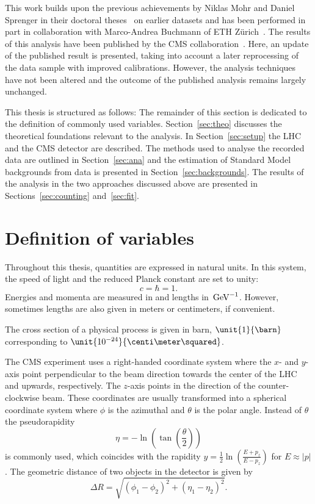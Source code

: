This work builds upon the previous achievements by Niklas Mohr and Daniel Sprenger in their doctoral theses~\cite{Mohr:1423334,Sprenger:1501963} on earlier datasets and has been performed in part in collaboration with Marco-Andrea Buchmann of ETH Z\"urich~\cite{Buchmann:1704399}. The results of this analysis have been published by the CMS collaboration~\cite{Khachatryan:2015lwa}. Here, an update of the published result is presented, taking into account a later reprocessing of the data sample with improved calibrations. However, the analysis techniques have not been altered and the outcome of the published analysis remains largely unchanged.

This thesis is structured as follows: The remainder of this section is dedicated to the definition of commonly used variables. Section~\ref{sec:theo} discusses the theoretical foundations relevant to the analysis. In Section~\ref{sec:setup} the LHC and the CMS detector are described. The methods used to analyse the recorded data are outlined in Section~\ref{sec:ana} and the estimation of Standard Model backgrounds from data is presented in Section~\ref{sec:backgrounds}. The results of the analysis in the two approaches discussed above are presented in Sections~\ref{sec:counting} and~\ref{sec:fit}. 

\section{Definition of variables}
\label{sec:variables}
Throughout this thesis, quantities are expressed in natural units. In this system, the speed of light and the reduced Planck constant are set to unity:
\begin{equation}
c = \hbar = 1.
\end{equation} 
Energies and momenta are measured in \GeV and lengths in $\text{\ensuremath{\,\mathrm{Ge\hspace{-.08em}V}}}^{-1}$. However, sometimes lengths are also given in meters or centimeters, if convenient. 

The cross section of a physical process is given in barn, $\unit{1}{\barn}$ corresponding to $\unit{10^{-24}}{\centi\meter\squared}$.   

The CMS experiment uses a right-handed coordinate system where the $x$- and $y$-axis point perpendicular to the beam direction towards the center of the LHC and upwards, respectively. The $z$-axis points in the direction of the counter-clockwise beam.  These coordinates are usually transformed into a spherical coordinate system where $\phi$ is the azimuthal and $\theta$ is the polar angle. Instead of $\theta$ the pseudorapidity 
\begin{equation}
\eta = -\ln \left( \tan\left(\frac{\theta}{2}\right)\right)
\end{equation}
is commonly used, which coincides with the rapidity $y = \frac{1}{2} \ln\left(\frac{E+p_z}{E-p_z}\right)$ for $E\approx |p|$. The geometric distance of two objects in the detector is given by
\begin{equation}
\Delta R = \sqrt{(\phi_1 - \phi_2)^2 + (\eta_1 - \eta_2)^2}.
\end{equation}

